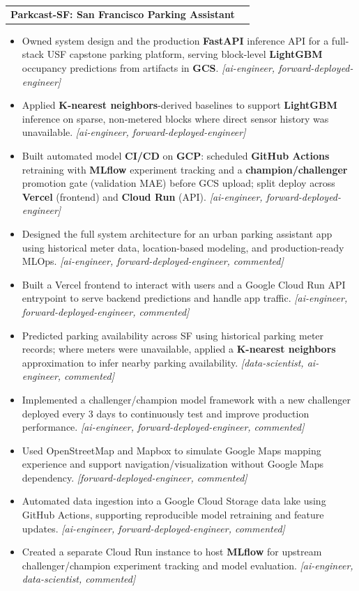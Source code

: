 \documentclass[letterpaper,11pt]{article}
\makeatletter
\newcommand{\resumeItem}[1]{
  \item\small{
    {#1 \vspace{-3pt}}
  }
}
\newcommand{\resumeProjectHeading}[2]{
  \vspace{-3pt}\item
    \begin{tabular*}{1.0\textwidth}[t]{l@{\extracolsep{\fill}}r}
      \textbf{#1} & \textbf{\small #2} \\
    \end{tabular*}\vspace{-7pt}
}
\newcommand{\resumeItemListStart}{\begin{itemize}}
\newcommand{\resumeItemListEnd}{\end{itemize}\vspace{0pt}}
\makeatother
\begin{document}
        \resumeProjectHeading
        {\textbf{Parkcast-SF: San Francisco Parking Assistant}}{}
        \resumeItemListStart
            \resumeItem{Owned system design and the production \textbf{FastAPI} inference API for a full-stack USF capstone parking platform, serving block-level \textbf{LightGBM} occupancy predictions from artifacts in \textbf{GCS}. \textit{[ai-engineer, forward-deployed-engineer]}}
            \resumeItem{Applied \textbf{K-nearest neighbors}-derived baselines to support \textbf{LightGBM} inference on sparse, non-metered blocks where direct sensor history was unavailable. \textit{[ai-engineer, forward-deployed-engineer]}}
            \resumeItem{Built automated model \textbf{CI/CD} on \textbf{GCP}: scheduled \textbf{GitHub Actions} retraining with \textbf{MLflow} experiment tracking and a \textbf{champion/challenger} promotion gate (validation MAE) before GCS upload; split deploy across \textbf{Vercel} (frontend) and \textbf{Cloud Run} (API). \textit{[ai-engineer, forward-deployed-engineer]}}
            \resumeItem{Designed the full system architecture for an urban parking assistant app using historical meter data, location-based modeling, and production-ready MLOps. \textit{[ai-engineer, forward-deployed-engineer, commented]}}
            \resumeItem{Built a Vercel frontend to interact with users and a Google Cloud Run API entrypoint to serve backend predictions and handle app traffic. \textit{[ai-engineer, forward-deployed-engineer, commented]}}
            \resumeItem{Predicted parking availability across SF using historical parking meter records; where meters were unavailable, applied a \textbf{K-nearest neighbors} approximation to infer nearby parking availability. \textit{[data-scientist, ai-engineer, commented]}}
            \resumeItem{Implemented a challenger/champion model framework with a new challenger deployed every 3 days to continuously test and improve production performance. \textit{[ai-engineer, forward-deployed-engineer, commented]}}
            \resumeItem{Used OpenStreetMap and Mapbox to simulate Google Maps mapping experience and support navigation/visualization without Google Maps dependency. \textit{[forward-deployed-engineer, commented]}}
            \resumeItem{Automated data ingestion into a Google Cloud Storage data lake using GitHub Actions, supporting reproducible model retraining and feature updates. \textit{[ai-engineer, forward-deployed-engineer, commented]}}
            \resumeItem{Created a separate Cloud Run instance to host \textbf{MLflow} for upstream challenger/champion experiment tracking and model evaluation. \textit{[ai-engineer, data-scientist, commented]}}
        \resumeItemListEnd
\end{document}
